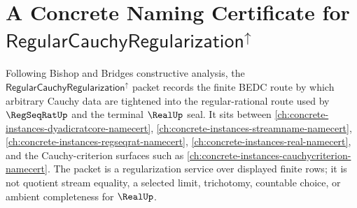 \providecommand{\RegularCauchyRegularizationUp}{\mathsf{RegularCauchyRegularization}^{\uparrow}}

\chapter{A Concrete Naming Certificate for $\RegularCauchyRegularizationUp$}
\label{ch:concrete-instances-regular-cauchy-regularization-namecert}

Following Bishop and Bridges constructive analysis, the $\RegularCauchyRegularizationUp$ packet records the finite BEDC route by which arbitrary Cauchy data are tightened into the regular-rational route used by $\RegSeqRatUp$ and the terminal $\RealUp$ seal. It sits between \autoref{ch:concrete-instances-dyadicratcore-namecert}, \autoref{ch:concrete-instances-streamname-namecert}, \autoref{ch:concrete-instances-regseqrat-namecert}, \autoref{ch:concrete-instances-real-namecert}, and the Cauchy-criterion surfaces such as \autoref{ch:concrete-instances-cauchycriterion-namecert}. The packet is a regularization service over displayed finite rows; it is not quotient stream equality, a selected limit, trichotomy, countable choice, or ambient completeness for $\RealUp$.

